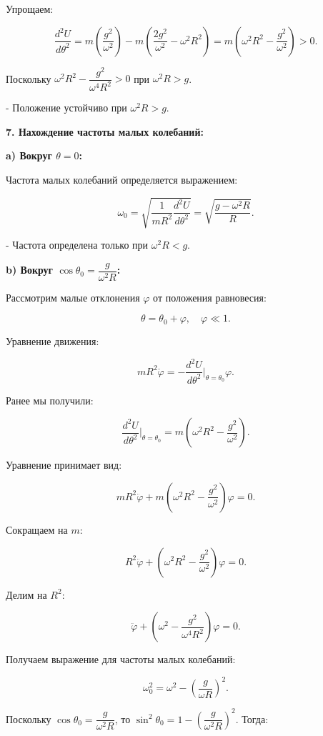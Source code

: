 \documentclass{article}
\begin{document}
Упрощаем:

\[
\dfrac{d^2 U}{d\theta^2} = m \left( \dfrac{g^2}{\omega^2} \right ) - m \left( \dfrac{2 g^2}{\omega^2} - \omega^2 R^2 \right ) = m \left( \omega^2 R^2 - \dfrac{g^2}{\omega^2} \right ) > 0.
\]

Поскольку \(\omega^2 R^2 - \dfrac{g^2}{\omega^4 R^2} > 0\) при \(\omega^2 R > g\).

- Положение устойчиво при \(\omega^2 R > g\).

\textbf{7. Нахождение частоты малых колебаний:}

\textbf{a) Вокруг \(\theta = 0\):}

Частота малых колебаний определяется выражением:

\[
\omega_0 = \sqrt{ \dfrac{1}{m R^2} \dfrac{d^2 U}{d\theta^2} } = \sqrt{ \dfrac{g - \omega^2 R}{R} }.
\]

- Частота определена только при \(\omega^2 R < g\).

\textbf{b) Вокруг \(\cos \theta_0 = \dfrac{g}{\omega^2 R}\):}

Рассмотрим малые отклонения \(\varphi\) от положения равновесия:

\[
\theta = \theta_0 + \varphi, \quad \varphi \ll 1.
\]

Уравнение движения:

\[
m R^2 \ddot{\varphi} = -\dfrac{d^2 U}{d\theta^2} \bigg|_{\theta = \theta_0} \varphi.
\]

Ранее мы получили:

\[
\dfrac{d^2 U}{d\theta^2} \bigg|_{\theta = \theta_0} = m \left( \omega^2 R^2 - \dfrac{g^2}{\omega^2} \right ).
\]

Уравнение принимает вид:

\[
m R^2 \ddot{\varphi} + m \left( \omega^2 R^2 - \dfrac{g^2}{\omega^2} \right ) \varphi = 0.
\]

Сокращаем на \(m\):

\[
R^2 \ddot{\varphi} + \left( \omega^2 R^2 - \dfrac{g^2}{\omega^2} \right ) \varphi = 0.
\]

Делим на \(R^2\):

\[
\ddot{\varphi} + \left( \omega^2 - \dfrac{g^2}{\omega^4 R^2} \right ) \varphi = 0.
\]

Получаем выражение для частоты малых колебаний:

\[
\omega_0^2 = \omega^2 - \left( \dfrac{g}{\omega R} \right )^2.
\]

Поскольку \(\cos \theta_0 = \dfrac{g}{\omega^2 R}\), то \(\sin^2 \theta_0 = 1 - \left( \dfrac{g}{\omega^2 R} \right )^2\). Тогда:
\end{document}
